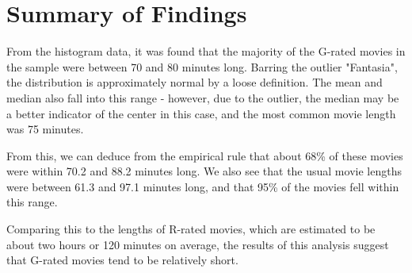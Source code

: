 \documentclass[twocolumn,english]{IEEEtran}
\theoremstyle{plain}
\theoremstyle{plain}
\begin{document}
\section{Summary of Findings}

From the histogram data, it was found that the majority of the G-rated movies in the sample were between 70 and 80 minutes long. Barring the outlier "Fantasia", the distribution is approximately normal by a loose definition. The mean and median also fall into this range - however, due to the outlier, the median may be a better indicator of the center in this case, and the most common movie length was 75 minutes.

From this, we can deduce from the empirical rule that about 68\% of these movies were within 70.2 and 88.2 minutes long. We also see that the usual movie lengths were between 61.3 and 97.1 minutes long, and that 95\% of the movies fell within this range.

Comparing this to the lengths of R-rated movies, which are estimated to be about two hours or 120 minutes on average, the results of this analysis suggest that G-rated movies tend to be relatively short.


%
%
\end{document}

